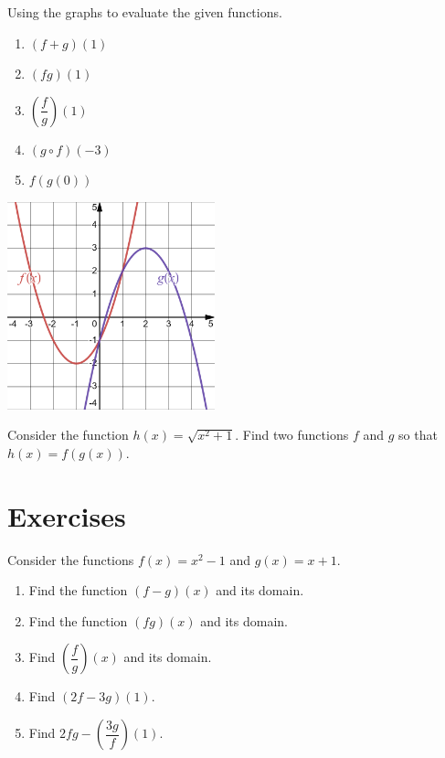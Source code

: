 \begin{example}
  Using the graphs to evaluate the given functions.
  \begin{multicols}{2}
    \begin{enumerate}
      \item $(f+g)(1)$
      \item $(fg)(1)$
      \item $\left(\dfrac{f}{g}\right)(1)$
      \item $(g\circ f)(-3)$
      \item $f(g(0))$
    \end{enumerate}
    \columnbreak
    \includegraphics[width=0.45\textwidth]{figs/twoquadratics.png}
  \end{multicols}
\end{example}
\vspace*{-0.2\textheight}

\begin{example}
  Consider the function $h(x)=\sqrt{x^2+1}$. Find two functions $f$ and $g$ so that $h(x)=f(g(x))$.
\end{example}

\newpage

\section*{Exercises}

\begin{exercise}
  Consider the functions \(f(x)=x^2-1\) and \(g(x)=x+1\). 
  \begin{enumerate}
    \item Find the function \((f-g)(x)\) and its domain.
    \item Find the function \((fg)(x)\) and its domain.
    \item Find \(\left(\dfrac{f}{g}\right)(x)\) and its domain.
    \item Find \((2f-3g)(1)\).
    \item Find \(2fg-\left(\dfrac{3g}{f}\right)(1)\).
  \end{enumerate}
\end{exercise}

